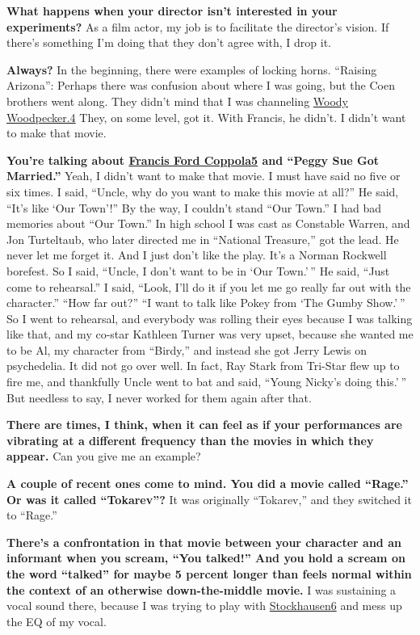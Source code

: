 \textbf{What happens when your director isn't interested in your
experiments?} As a film actor, my job is to facilitate the director's
vision. If there's something I'm doing that they don't agree with, I
drop it.

\textbf{Always?} In the beginning, there were examples of locking horns.
``Raising Arizona'': Perhaps there was confusion about where I was
going, but the Coen brothers went along. They didn't mind that I was
channeling \href{http://nytimes3xbfgragh.onion\#tooltip-4}{Woody
Woodpecker.4} They, on some level, got it. With Francis, he didn't. I
didn't want to make that movie.

\textbf{You're talking about
\href{http://nytimes3xbfgragh.onion\#tooltip-5}{Francis Ford Coppola5}
and ``Peggy Sue Got Married.''} Yeah, I didn't want to make that movie.
I must have said no five or six times. I said, ``Uncle, why do you want
to make this movie at all?'' He said, ``It's like `Our Town'!'' By the
way, I couldn't stand ``Our Town.'' I had bad memories about ``Our
Town.'' In high school I was cast as Constable Warren, and Jon
Turteltaub, who later directed me in ``National Treasure,'' got the
lead. He never let me forget it. And I just don't like the play. It's a
Norman Rockwell borefest. So I said, ``Uncle, I don't want to be in `Our
Town.' '' He said, ``Just come to rehearsal.'' I said, ``Look, I'll do
it if you let me go really far out with the character.'' ``How far
out?'' ``I want to talk like Pokey from `The Gumby Show.' '' So I went
to rehearsal, and everybody was rolling their eyes because I was talking
like that, and my co-star Kathleen Turner was very upset, because she
wanted me to be Al, my character from ``Birdy,'' and instead she got
Jerry Lewis on psychedelia. It did not go over well. In fact, Ray Stark
from Tri-Star flew up to fire me, and thankfully Uncle went to bat and
said, ``Young Nicky's doing this.' '' But needless to say, I never
worked for them again after that.

\textbf{There are times, I think, when it can feel as if your
performances are vibrating at a different frequency than the movies in
which they appear.} Can you give me an example?

\textbf{A couple of recent ones come to mind. You did a movie called
``Rage.'' Or was it called ``Tokarev''?} It was originally ``Tokarev,''
and they switched it to ``Rage.''

\textbf{There's a confrontation in that movie between your character and
an informant when you scream, ``You talked!'' And you hold a scream on
the word ``talked'' for maybe 5 percent longer than feels normal within
the context of an otherwise down-the-middle movie.} I was sustaining a
vocal sound there, because I was trying to play with
\href{http://nytimes3xbfgragh.onion\#tooltip-6}{Stockhausen}\href{http://nytimes3xbfgragh.onion\#tooltip-6}{6}
and mess up the EQ of my vocal.

